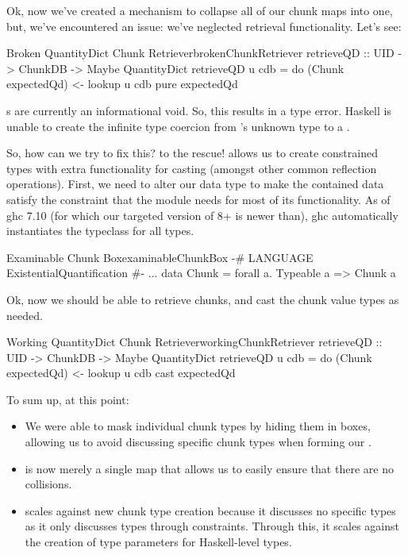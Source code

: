 Ok, now we've created a mechanism to collapse all of our chunk maps into one,
but, we've encountered an issue: we've neglected retrieval functionality. Let's
see:

\begin{pseudohaskell}{Broken QuantityDict Chunk Retriever}{brokenChunkRetriever}
retrieveQD :: UID -> ChunkDB -> Maybe QuantityDict
retrieveQD u cdb = do
    (Chunk expectedQd) <- lookup u cdb
    pure expectedQd
\end{pseudohaskell}

\Chunk{}s are currently an informational void. So, this results in a type
error. Haskell is unable to create the infinite
type coercion from 's unknown type to a \QuantityDict{}.

So, how can we try to fix this?  to the rescue!
 allows us to create constrained types with extra
functionality for casting (amongst other common reflection operations). First,
we need to alter our \Chunk{} data type to make the contained data satisfy the
\Typeable{} constraint that the \Typeable{} module needs for most of its
functionality. As of \acs{ghc} 7.10 (for which our targeted version of 8+ is
newer than), \acs{ghc} automatically instantiates the \Typeable{} typeclass for
all types.

\begin{pseudohaskell}{Examinable Chunk Box}{examinableChunkBox}
{-# LANGUAGE ExistentialQuantification #-}
...
data Chunk = forall a. Typeable a => Chunk a
\end{pseudohaskell}

Ok, now we should be able to retrieve chunks, and cast the chunk value types as
needed.

\begin{pseudohaskell}{Working QuantityDict Chunk Retriever}{workingChunkRetriever}
retrieveQD :: UID -> ChunkDB -> Maybe QuantityDict
retrieveQD u cdb = do
    (Chunk expectedQd) <- lookup u cdb
    cast expectedQd
\end{pseudohaskell}

To sum up, at this point:

\begin{itemize}

      \item We were able to mask individual chunk types by hiding them in
            \Chunk{} boxes, allowing us to avoid discussing specific chunk types
            when forming our \ChunkDB{}.

      \item \ChunkDB{} is now merely a single map that allows us to easily
            ensure that there are no \UID{} collisions.

      \item \ChunkDB{} scales against new chunk type creation because it
            discusses no specific types as it only discusses types through
            constraints. Through this, it scales against the creation of type
            parameters for Haskell-level types.

\end{itemize}

